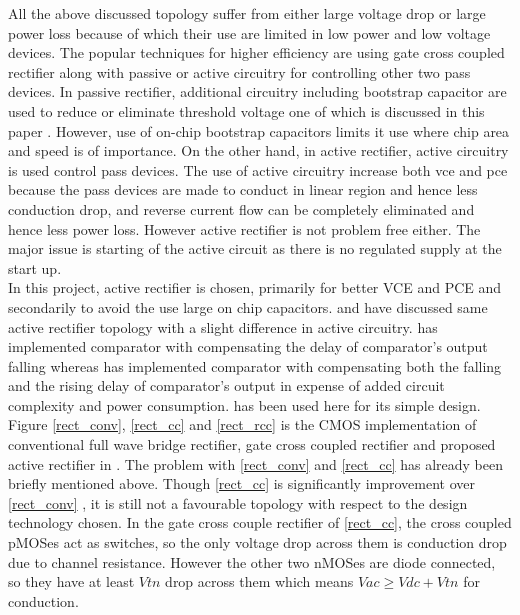 \documentclass[12pt,a4paper,UKenglish]{article}
\begin{document}
All the above discussed topology suffer from either large voltage drop or large power loss because of which their use are limited in low power and low voltage devices. The popular techniques for higher efficiency are using gate cross coupled rectifier along with passive or active circuitry  for controlling other two pass devices. In passive rectifier, additional circuitry including bootstrap capacitor are used to reduce or eliminate threshold voltage one of which is discussed in this paper \cite{rectboot}. However, use of on-chip bootstrap capacitors limits it use where chip area and speed is of importance. On the other hand, in active rectifier, active circuitry is used control pass devices. The use of active circuitry increase both  \gls{vce} and  \gls{pce} because the pass devices are made to conduct in linear region and hence less conduction drop, and reverse current flow can be completely eliminated and hence less power loss. However active rectifier is not problem free either. The major issue is starting of the active circuit as there is no regulated supply at the start up. \\

In this project, active rectifier is chosen, primarily for better VCE and PCE and secondarily to avoid the use large on chip capacitors. \cite{rectrcc}  and \cite{rectcomp} have discussed same active rectifier topology with a slight difference in active circuitry. \cite{rectrcc} has implemented comparator with compensating the delay of comparator's output falling whereas \cite{rectcomp} has implemented comparator with compensating both the falling and the rising delay of comparator's output in expense of added circuit complexity and power consumption. \cite{rectrcc} has been used here for its simple design. \\

Figure \ref{rect_conv}, \ref{rect_cc} and \ref{rect_rcc} is the CMOS implementation of conventional full wave bridge rectifier, gate cross coupled rectifier and proposed active rectifier in \cite{rectrcc}. The problem with \ref{rect_conv} and \ref{rect_cc} has already been briefly mentioned above. Though  \ref{rect_cc}  is significantly improvement over  \ref{rect_conv} , it is still not a favourable topology with respect to the design technology chosen. In the gate cross couple rectifier of  \ref{rect_cc}, the cross coupled pMOSes act as switches, so the only voltage drop across them is conduction drop due to channel resistance. However the other two nMOSes are diode connected, so they have at least $Vtn$ drop across them which means $Vac \geq Vdc + Vtn$ for conduction. \\
\end{document}
